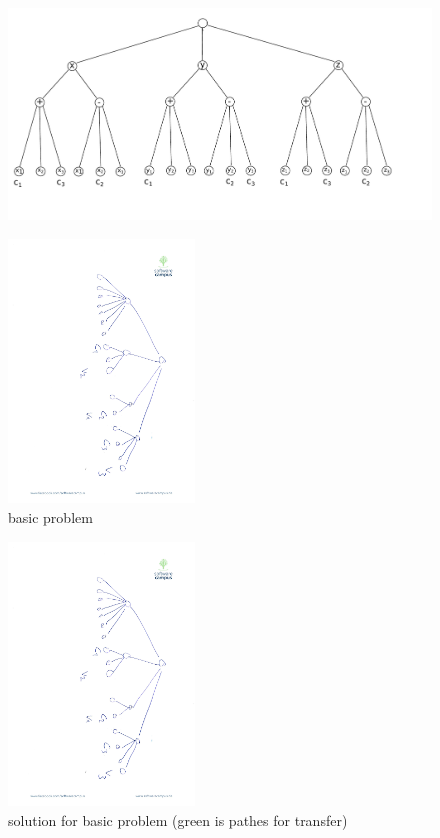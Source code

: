 \documentclass[9pt,twocolumn]{scrartcl}
\begin{document}
\begin{appendix}
\begin{figure}[htbp]
\includegraphics[width = \columnwidth]{figs/formula-example}
\end{figure}


\begin{figure}

\includegraphics[angle=90,origin=c, height=7cm]{figs/model_fig_skteches/basic_problem}
\caption{basic problem}
\label{fig:basic_problem}
\end{figure}
\begin{figure}

\includegraphics[angle=90,origin=c, height=7cm]{figs/model_fig_skteches/basic_problem}
\caption{solution for basic problem (green is pathes for transfer)}
\end{figure}


\end{appendix}
\end{document}
